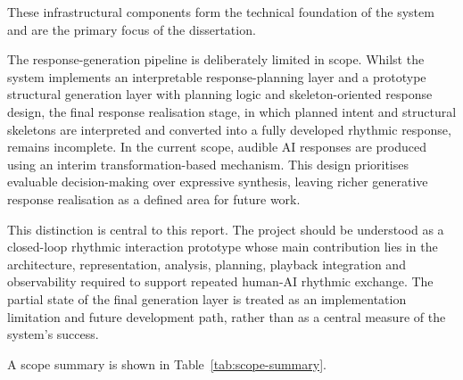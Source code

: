 These infrastructural components form the technical foundation of the
system and are the primary focus of the dissertation.

The response-generation pipeline is deliberately limited in scope.
Whilst the system implements an interpretable response-planning layer
and a prototype structural generation layer with planning logic and
skeleton-oriented response design, the final response realisation stage,
in which planned intent and structural skeletons are interpreted and
converted into a fully developed rhythmic response, remains incomplete.
In the current scope, audible AI responses are produced using an interim
transformation-based mechanism. This design prioritises evaluable
decision-making over expressive synthesis, leaving richer generative
response realisation as a defined area for future work.

This distinction is central to this report. The project should be
understood as a closed-loop rhythmic interaction prototype whose main
contribution lies in the architecture, representation, analysis,
planning, playback integration and observability required to support
repeated human-AI rhythmic exchange. The partial state of the final
generation layer is treated as an implementation limitation and future
development path, rather than as a central measure of the system's
success.

A scope summary is shown in Table~\ref{tab:scope-summary}.

